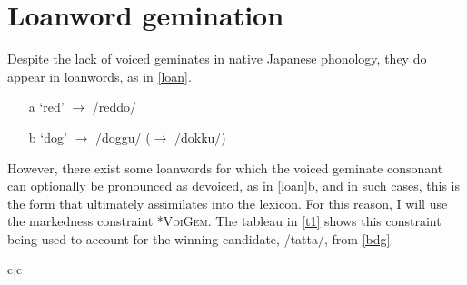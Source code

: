 \documentclass{article}
\begin{document}



\section{Loanword gemination}

Despite the lack of voiced geminates in native Japanese phonology, they do appear in loanwords, as in \ref{loan}. \citep[p. 3]{Kawahara2015}

\begin{exe}
    \ex
    \label{loan}
    \begin{itemize}
        \item [a] ‘red' $\rightarrow$ /reddo/
        \item [b] ‘dog' $\rightarrow$ /doggu/ ($\rightarrow$ /dokku/)
    \end{itemize}
\end{exe}

However, there exist some loanwords for which the voiced geminate consonant can optionally be pronounced as devoiced, as in \ref{loan}b, and in such cases, this is the form that ultimately assimilates into the lexicon. For this reason, I will use the markedness constraint \textsc{*VoiGem}. The tableau in \ref{t1} shows this constraint being used to account for the winning candidate, /tatta/, from \ref{bdg}.

\vspace{.25cm}

\begin{exe}
\ex
\label{t1}
\begin{tableau}{c|c}
  
             \vio{*!}   \vio{}            
    \vio{}    \vio{*}          
\end{tableau}
\end{exe}
\end{document}
